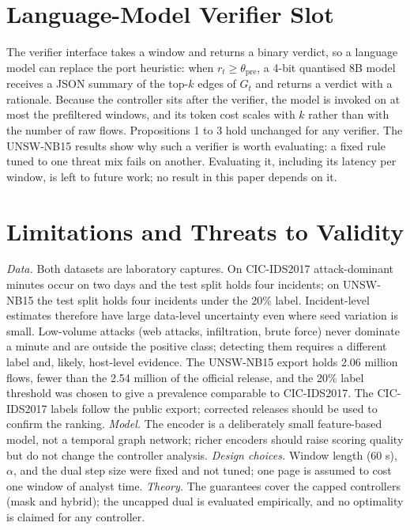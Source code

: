 \documentclass[journal,10pt,twocolumn]{IEEEtran}
\begin{document}
\section{Language-Model Verifier Slot}
\label{sec:llm}
The verifier interface takes a window and returns a binary verdict, so a language model can replace the port heuristic: when $r_t\ge\theta_{\mathrm{pre}}$, a 4-bit quantised 8B model \cite{dettmers2023qlora,dubey2024llama3} receives a JSON summary of the top-$k$ edges of $G_t$ and returns a verdict with a rationale. Because the controller sits after the verifier, the model is invoked on at most the prefiltered windows, and its token cost scales with $k$ rather than with the number of raw flows. Propositions 1 to 3 hold unchanged for any verifier. The UNSW-NB15 results show why such a verifier is worth evaluating: a fixed rule tuned to one threat mix fails on another. Evaluating it, including its latency per window, is left to future work; no result in this paper depends on it.

\section{Limitations and Threats to Validity}
\label{sec:limits}
\emph{Data.} Both datasets are laboratory captures. On CIC-IDS2017 attack-dominant minutes occur on two days and the test split holds four incidents; on UNSW-NB15 the test split holds four incidents under the 20\% label. Incident-level estimates therefore have large data-level uncertainty even where seed variation is small. Low-volume attacks (web attacks, infiltration, brute force) never dominate a minute and are outside the positive class; detecting them requires a different label and, likely, host-level evidence. The UNSW-NB15 export holds 2.06 million flows, fewer than the 2.54 million of the official release, and the 20\% label threshold was chosen to give a prevalence comparable to CIC-IDS2017. The CIC-IDS2017 labels follow the public export; corrected releases \cite{engelen2021troubleshooting,lanvin2023errors} should be used to confirm the ranking.
\emph{Model.} The encoder is a deliberately small feature-based model, not a temporal graph network; richer encoders \cite{rossi2020tgn,lo2022egraphsage,king2022euler} should raise scoring quality but do not change the controller analysis.
\emph{Design choices.} Window length (60 s), $\alpha$, and the dual step size were fixed and not tuned; one page is assumed to cost one window of analyst time.
\emph{Theory.} The guarantees cover the capped controllers (mask and hybrid); the uncapped dual is evaluated empirically, and no optimality is claimed for any controller.
\end{document}
